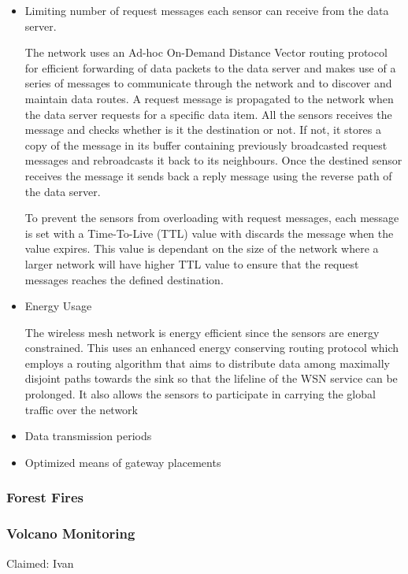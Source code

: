 \begin{itemize}
\item Limiting number of request messages each sensor can receive from the data server.

The network uses an Ad-hoc On-Demand Distance Vector routing protocol for efficient forwarding of data packets to the data server and makes use of a series of messages to communicate through the network and to discover and maintain data routes. A request message is propagated to the network when the data server requests for a specific data item. All the sensors receives the message and checks whether is it the destination or not. If not, it stores a copy of the message in its buffer containing previously broadcasted request messages and rebroadcasts it back to its neighbours. Once the destined sensor receives the message it sends back a reply message using the reverse path of the data server.

To prevent the sensors from overloading with request messages, each message is set with a Time-To-Live (TTL) value with discards the message when the value expires. This value is dependant on the size of the network where a larger network will have higher TTL value to ensure that the request messages reaches the defined destination.

\item Energy Usage

The wireless mesh network is energy efficient since the sensors are energy constrained. This uses an enhanced energy conserving routing protocol which employs a routing algorithm that aims to distribute data among maximally disjoint paths towards the sink so that the lifeline of the WSN service can be prolonged. It also allows the sensors to participate in carrying the global traffic over the network

\item Data transmission periods
\item Optimized means of gateway placements
\end{itemize}

\subsubsection*{Forest Fires}
\cite{libeliumForestFires}
\cite{FireWxNet}

\subsubsection*{Volcano Monitoring}
Claimed: Ivan

